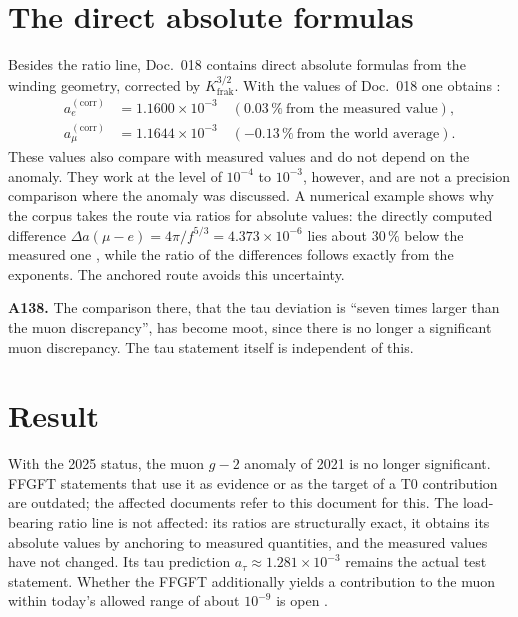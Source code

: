 \section{The direct absolute formulas}
Besides the ratio line, Doc.~018 contains direct absolute formulas from the winding
geometry, corrected by $K_\mathrm{frak}^{3/2}$. With the values of Doc.~018 one obtains
\KM:
\begin{align*}
  a_e^{(\mathrm{corr})} &= 1.1600\times10^{-3}\quad(0.03\,\%\ \text{from the measured value}),\\
  a_\mu^{(\mathrm{corr})} &= 1.1644\times10^{-3}\quad(-0.13\,\%\ \text{from the world average}).
\end{align*}
These values also compare with measured values and do not depend on the anomaly. They
work at the level of $10^{-4}$ to $10^{-3}$, however, and are not a precision comparison
where the anomaly was discussed. A numerical example shows why the corpus takes the
route via ratios for absolute values: the directly computed difference
$\Delta a(\mu{-}e)=4\pi/f^{5/3}=4.373\times10^{-6}$ lies about $30\,\%$ below the measured
one \KM, while the ratio of the differences follows exactly from the exponents. The
anchored route avoids this uncertainty.

\textbf{A138.} The comparison there, that the tau deviation is ``seven times larger than
the muon discrepancy'', has become moot, since there is no longer a significant muon
discrepancy. The tau statement itself is independent of this.

\section{Result}
With the 2025 status, the muon $g-2$ anomaly of 2021 is no longer significant. FFGFT
statements that use it as evidence or as the target of a T0 contribution are outdated;
the affected documents refer to this document for this. The load-bearing ratio line is not affected:
its ratios are structurally exact, it obtains its absolute values by anchoring to
measured quantities, and the measured values have not changed. Its tau prediction
$a_\tau\approx1.281\times10^{-3}$ remains the actual test statement. Whether the FFGFT
additionally yields a contribution to the muon within today's allowed range of about
$10^{-9}$ is open \SM.

